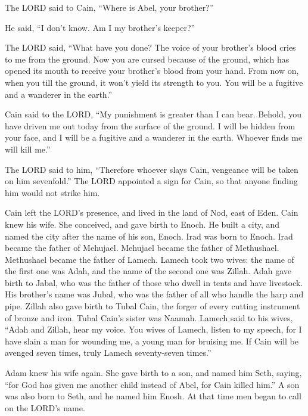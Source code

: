  The LORD said to Cain, ``Where is Abel, your brother?''

He said, ``I don't know. Am I my brother's keeper?''

 The LORD said, ``What have you done? The voice of your
brother's blood cries to me from the ground.  Now you are
cursed because of the ground, which has opened its mouth to receive your
brother's blood from your hand.  From now on, when you till
the ground, it won't yield its strength to you. You will be a fugitive
and a wanderer in the earth.''

 Cain said to the LORD, ``My punishment is greater than I
can bear.  Behold, you have driven me out today from the
surface of the ground. I will be hidden from your face, and I will be a
fugitive and a wanderer in the earth. Whoever finds me will kill me.''

 The LORD said to him, ``Therefore whoever slays Cain,
vengeance will be taken on him sevenfold.'' The LORD appointed a sign
for Cain, so that anyone finding him would not strike him.

 Cain left the LORD's presence, and lived in the land of
Nod, east of Eden.  Cain knew his wife. She conceived, and
gave birth to Enoch. He built a city, and named the city after the name
of his son, Enoch.  Irad was born to Enoch. Irad became the
father of Mehujael. Mehujael became the father of Methushael. Methushael
became the father of Lamech.  Lamech took two wives: the
name of the first one was Adah, and the name of the second one was
Zillah.  Adah gave birth to Jabal, who was the father of
those who dwell in tents and have livestock.  His brother's
name was Jubal, who was the father of all who handle the harp and pipe.
 Zillah also gave birth to Tubal Cain, the forger of every
cutting instrument of bronze and iron. Tubal Cain's sister was Naamah.
 Lamech said to his wives, ``Adah and Zillah, hear my
voice. You wives of Lamech, listen to my speech, for I have slain a man
for wounding me, a young man for bruising me.  If Cain will
be avenged seven times, truly Lamech seventy-seven times.''

 Adam knew his wife again. She gave birth to a son, and
named him Seth, saying, ``for God has given me another child instead of
Abel, for Cain killed him.''  A son was also born to Seth,
and he named him Enosh. At that time men began to call on the LORD's
name.

